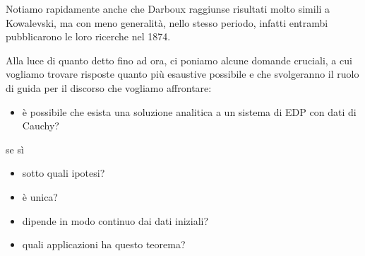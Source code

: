 Notiamo rapidamente anche che Darboux raggiunse risultati molto simili a Kowalevski, ma con meno generalità, nello stesso periodo, infatti entrambi pubblicarono le loro ricerche nel 1874.

Alla luce di quanto detto fino ad ora, ci poniamo alcune domande cruciali, a cui vogliamo trovare risposte quanto più esaustive possibile e che svolgeranno il ruolo di guida per il discorso che vogliamo affrontare:
\begin{itemize}
\item è possibile che esista una soluzione analitica a un sistema di EDP con dati di Cauchy?
\end{itemize}
se sì
\begin{itemize}
\item sotto quali ipotesi?
\item è unica?
\item dipende in modo continuo dai dati iniziali?
\item quali applicazioni ha questo teorema?
\end{itemize}



